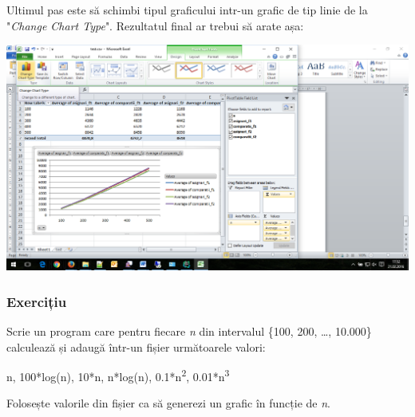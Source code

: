 \documentclass[../ro-fa-lab.tex]{subfiles}
\begin{document}
Ultimul pas este să schimbi tipul graficului intr-un grafic de tip linie
de la "\emph{Change Chart Type}". Rezultatul final ar trebui să arate
așa:

\includegraphics[width=\textwidth]{../Resources/lab0/image15.png}

\subsubsection{Exercițiu}\label{exerciux21biu}

Scrie un program care pentru fiecare \emph{n} din intervalul \{100, 200,
\ldots, 10.000\} calculează și adaugă într-un fișier următoarele valori:

n, 100*log(n), 10*n, n*log(n), 0.1*n\textsuperscript{2},
0.01*n\textsuperscript{3}

Folosește valorile din fișier ca să generezi un grafic în funcție de
\emph{n}.
\end{document}
